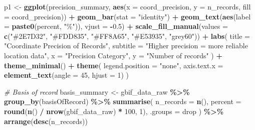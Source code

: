 \documentclass[
]{article}
\newenvironment{Shaded}{\begin{snugshade}}{\end{snugshade}}
\newcommand{\AttributeTok}[1]{\textcolor[rgb]{0.13,0.29,0.53}{#1}}
\newcommand{\CommentTok}[1]{\textcolor[rgb]{0.56,0.35,0.01}{\textit{#1}}}
\newcommand{\DecValTok}[1]{\textcolor[rgb]{0.00,0.00,0.81}{#1}}
\newcommand{\FloatTok}[1]{\textcolor[rgb]{0.00,0.00,0.81}{#1}}
\newcommand{\FunctionTok}[1]{\textcolor[rgb]{0.13,0.29,0.53}{\textbf{#1}}}
\newcommand{\NormalTok}[1]{#1}
\newcommand{\OtherTok}[1]{\textcolor[rgb]{0.56,0.35,0.01}{#1}}
\newcommand{\SpecialCharTok}[1]{\textcolor[rgb]{0.81,0.36,0.00}{\textbf{#1}}}
\newcommand{\StringTok}[1]{\textcolor[rgb]{0.31,0.60,0.02}{#1}}
\begin{document}
\begin{Shaded}
\begin{Highlighting}[]
\NormalTok{p1 }\OtherTok{\textless{}{-}} \FunctionTok{ggplot}\NormalTok{(precision\_summary, }\FunctionTok{aes}\NormalTok{(}\AttributeTok{x =}\NormalTok{ coord\_precision, }\AttributeTok{y =}\NormalTok{ n\_records, }\AttributeTok{fill =}\NormalTok{ coord\_precision)) }\SpecialCharTok{+}
  \FunctionTok{geom\_bar}\NormalTok{(}\AttributeTok{stat =} \StringTok{"identity"}\NormalTok{) }\SpecialCharTok{+}
  \FunctionTok{geom\_text}\NormalTok{(}\FunctionTok{aes}\NormalTok{(}\AttributeTok{label =} \FunctionTok{paste0}\NormalTok{(percent, }\StringTok{"\%"}\NormalTok{)), }\AttributeTok{vjust =} \SpecialCharTok{{-}}\FloatTok{0.5}\NormalTok{) }\SpecialCharTok{+}
  \FunctionTok{scale\_fill\_manual}\NormalTok{(}\AttributeTok{values =} \FunctionTok{c}\NormalTok{(}\StringTok{"\#2E7D32"}\NormalTok{, }\StringTok{"\#FDD835"}\NormalTok{, }\StringTok{"\#FF8A65"}\NormalTok{, }\StringTok{"\#E53935"}\NormalTok{, }\StringTok{"grey60"}\NormalTok{)) }\SpecialCharTok{+}
  \FunctionTok{labs}\NormalTok{(}
    \AttributeTok{title =} \StringTok{"Coordinate Precision of Records"}\NormalTok{,}
    \AttributeTok{subtitle =} \StringTok{"Higher precision = more reliable location data"}\NormalTok{,}
    \AttributeTok{x =} \StringTok{"Precision Category"}\NormalTok{, }\AttributeTok{y =} \StringTok{"Number of records"}
\NormalTok{  ) }\SpecialCharTok{+}
  \FunctionTok{theme\_minimal}\NormalTok{() }\SpecialCharTok{+}
  \FunctionTok{theme}\NormalTok{(}
    \AttributeTok{legend.position =} \StringTok{"none"}\NormalTok{,}
    \AttributeTok{axis.text.x =} \FunctionTok{element\_text}\NormalTok{(}\AttributeTok{angle =} \DecValTok{45}\NormalTok{, }\AttributeTok{hjust =} \DecValTok{1}\NormalTok{)}
\NormalTok{  )}

\CommentTok{\# Basis of record}
\NormalTok{basis\_summary }\OtherTok{\textless{}{-}}\NormalTok{ gbif\_data\_raw }\SpecialCharTok{\%\textgreater{}\%}
  \FunctionTok{group\_by}\NormalTok{(basisOfRecord) }\SpecialCharTok{\%\textgreater{}\%}
  \FunctionTok{summarise}\NormalTok{(}
    \AttributeTok{n\_records =} \FunctionTok{n}\NormalTok{(),}
    \AttributeTok{percent =} \FunctionTok{round}\NormalTok{(}\FunctionTok{n}\NormalTok{() }\SpecialCharTok{/} \FunctionTok{nrow}\NormalTok{(gbif\_data\_raw) }\SpecialCharTok{*} \DecValTok{100}\NormalTok{, }\DecValTok{1}\NormalTok{),}
    \AttributeTok{.groups =} \StringTok{\textquotesingle{}drop\textquotesingle{}}
\NormalTok{  ) }\SpecialCharTok{\%\textgreater{}\%}
  \FunctionTok{arrange}\NormalTok{(}\FunctionTok{desc}\NormalTok{(n\_records))}


\end{Highlighting}
\end{Shaded}
\end{document}
